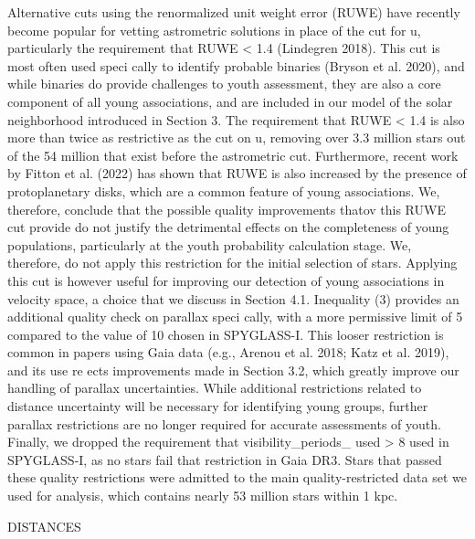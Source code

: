 \documentclass[../Main.tex]{subfiles}
\begin{document}
{Alternative cuts using the renormalized unit weight error
(RUWE) have recently become popular for vetting astrometric
solutions in place of the cut for u, particularly the requirement
that RUWE < 1.4 (Lindegren 2018). This cut is most often
used speci cally to identify probable binaries (Bryson et al.
2020), and while binaries do provide challenges to youth
assessment, they are also a core component of all young
associations, and are included in our model of the solar
neighborhood introduced in Section 3. The requirement that
RUWE < 1.4 is also more than twice as restrictive as the cut on
u, removing over 3.3 million stars out of the 54 million that
exist before the astrometric cut. Furthermore, recent work by
Fitton et al. (2022) has shown that RUWE is also increased by
the presence of protoplanetary disks, which are a common
feature of young associations. We, therefore, conclude that the
possible quality improvements thatov this RUWE cut provide
do not justify the detrimental effects on the completeness of
young populations, particularly at the youth probability
calculation stage. We, therefore, do not apply this restriction
for the initial selection of stars. Applying this cut is however
useful for improving our detection of young associations in
velocity space, a choice that we discuss in Section 4.1.
Inequality (3) provides an additional quality check on
parallax speci cally, with a more permissive limit of 5
compared to the value of 10 chosen in SPYGLASS-I. This
looser restriction is common in papers using Gaia data (e.g.,
Arenou et al. 2018; Katz et al. 2019), and its use re ects
improvements made in Section 3.2, which greatly improve our
handling of parallax uncertainties. While additional restrictions
related to distance uncertainty will be necessary for identifying
young groups, further parallax restrictions are no longer
required for accurate assessments of youth. Finally, we dropped
the requirement that visibility_periods_
used > 8
used in SPYGLASS-I, as no stars fail that restriction in Gaia
DR3. Stars that passed these quality restrictions were admitted
to the main quality-restricted data set we used for analysis,
which contains nearly 53 million stars within 1 kpc.

DISTANCES 

}
\end{document}
